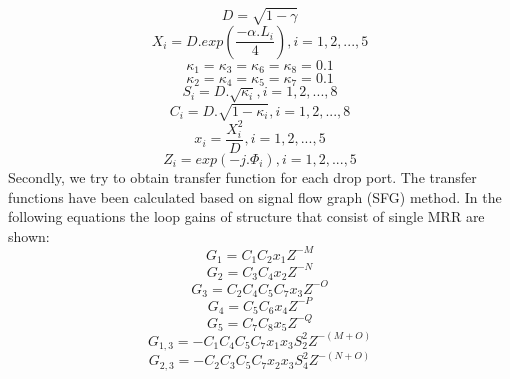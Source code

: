 \documentclass{osa-article}
\begin{document}
 \begin{equation}
D=\sqrt{1-\gamma}
\label{eqa13}
\end{equation}
 \begin{equation}
X_{i}=D.exp(\frac{-\alpha.L_{i}}{4}), i=1, 2, ...,5
\label{eqa14}
\end{equation}
 \begin{equation}
\kappa_1=\kappa_3=\kappa_6=\kappa_8=0.1
\label{eqa15}
\end{equation}
 \begin{equation}
\kappa_2=\kappa_4=\kappa_5=\kappa_7=0.1
\label{eqa16}
\end{equation}
 \begin{equation}
S_i=D.\sqrt{\kappa_i}, i=1, 2, ..., 8
\label{eqa17}
\end{equation}
 \begin{equation}
C_i=D.\sqrt{1-\kappa_i}, i=1, 2, ..., 8
\label{eqa18}
\end{equation}
 \begin{equation}
x_i=\frac{X^2_i}{D}, i=1, 2, ..., 5
\label{eqa19}
\end{equation}
 \begin{equation}
Z_i=exp(-j.\Phi_i), i=1, 2, ..., 5
\label{eqa20}
\end{equation}
Secondly, we try to obtain transfer function for each drop port. The transfer functions have been calculated based on signal flow graph (SFG) method. In the following equations the loop gains of structure that consist of single MRR are shown:
 \begin{equation}
G_1=C_1C_2x_1Z^{-M}
\label{eqa21}
\end{equation}
 \begin{equation}
G_2=C_3C_4x_2Z^{-N}
\label{eqa22}
\end{equation}
 \begin{equation}
G_3=C_2C_4C_5C_7x_3Z^{-O}
\label{eqa23}
\end{equation}
 \begin{equation}
G_4=C_5C_6x_4Z^{-P}
\label{eqa24}
\end{equation}
 \begin{equation}
G_5=C_7C_8x_5Z^{-Q}
\label{eqa25}
\end{equation}
 \begin{equation}
G_{1,3}=-C_1C_4C_5C_7x_1x_3{S^2_2}Z^{-(M+O)}
\label{eqa26}
\end{equation}
 \begin{equation}
G_{2,3}=-C_2C_3C_5C_7x_2x_3{S^2_4}Z^{-(N+O)}
\label{eqa27}
\end{equation}
\end{document}
